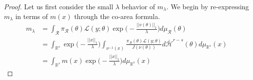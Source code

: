 \documentclass[10pt,fleqn]{article}
\DeclareMathOperator{\1}{\mathbbm{1}}
\begin{document}
\begin{proof}
%
%
%
%
%
Let us first consider the small $\lambda$ behavior of $m_\lambda.$ We begin by re-expressing $m_\lambda$ in terms of $m(x)$ through the co-area formula.
\begin{align*}
m_\lambda &= \int_\mathcal{R} \pi_\mathcal{R}(\theta) \mathcal{L}(y;\theta) \exp\bigg(-\frac{||v(\theta)||_1}{\lambda}\bigg) d\mu_\mathcal{R}(\theta) \\
&= \int_{\mathbb{R}^s} \exp\bigg(-\frac{||x||_1}{\lambda}\bigg) \int_{\nu^{-1}(x)} \frac{\pi_\mathcal{R}(\theta) \mathcal{L}(y;\theta)}{J(\nu(\theta))} d\bar{\mathcal{H}}^{r-s}(\theta) d\mu_{\mathbb{R}^s} (x) \\
&=\int_{\mathbb{R}^s}m(x) \exp\bigg(-\frac{||x||_1}{\lambda}\bigg)d\mu_{\mathbb{R}^s}(x)
\end{align*}


\end{proof}
\end{document}
